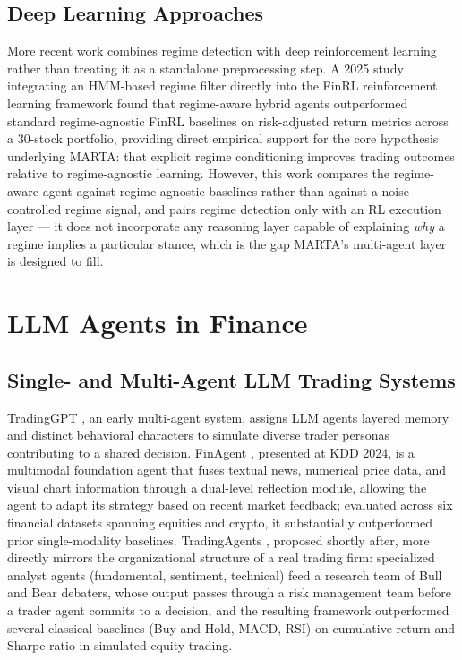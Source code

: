 \subsection{Deep Learning Approaches}
\label{subsec:regime-deep-learning}

More recent work combines regime detection with deep reinforcement learning rather than treating it as a standalone preprocessing step. A 2025 study integrating an HMM-based regime filter directly into the FinRL reinforcement learning framework \cite{hmm-finrl-2025} found that regime-aware hybrid agents outperformed standard regime-agnostic FinRL baselines on risk-adjusted return metrics across a 30-stock portfolio, providing direct empirical support for the core hypothesis underlying MARTA: that explicit regime conditioning improves trading outcomes relative to regime-agnostic learning. However, this work compares the regime-aware agent against regime-agnostic baselines rather than against a noise-controlled regime signal, and pairs regime detection only with an RL execution layer --- it does not incorporate any reasoning layer capable of explaining \emph{why} a regime implies a particular stance, which is the gap MARTA's multi-agent layer is designed to fill.

\section{LLM Agents in Finance}
\label{sec:llm-agents-finance}

\subsection{Single- and Multi-Agent LLM Trading Systems}
\label{subsec:llm-trading-systems}

TradingGPT \cite{tradinggpt2023}, an early multi-agent system, assigns LLM agents layered memory and distinct behavioral characters to simulate diverse trader personas contributing to a shared decision. FinAgent \cite{finagent2024}, presented at KDD 2024, is a multimodal foundation agent that fuses textual news, numerical price data, and visual chart information through a dual-level reflection module, allowing the agent to adapt its strategy based on recent market feedback; evaluated across six financial datasets spanning equities and crypto, it substantially outperformed prior single-modality baselines. TradingAgents \cite{tradingagents2024}, proposed shortly after, more directly mirrors the organizational structure of a real trading firm: specialized analyst agents (fundamental, sentiment, technical) feed a research team of Bull and Bear debaters, whose output passes through a risk management team before a trader agent commits to a decision, and the resulting framework outperformed several classical baselines (Buy-and-Hold, MACD, RSI) on cumulative return and Sharpe ratio in simulated equity trading.

